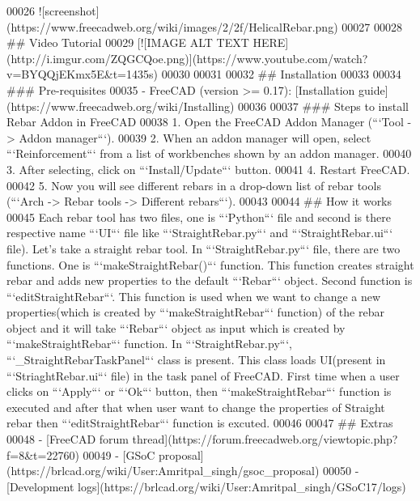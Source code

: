 \begin{DoxyCode}
00026 ![screenshot](https://www.freecadweb.org/wiki/images/2/2f/HelicalRebar.png)
00027 
00028 ## Video Tutorial
00029 [![IMAGE ALT TEXT
       HERE](http://i.imgur.com/ZQGCQoe.png)](https://www.youtube.com/watch?v=BYQQjEKmx5E&t=1435s)
00030 
00031 
00032 ## Installation
00033 
00034 ### Pre-requisites
00035 - FreeCAD (version >= 0.17): [Installation guide](https://www.freecadweb.org/wiki/Installing)
00036  
00037 ### Steps to install Rebar Addon in FreeCAD
00038 1. Open the FreeCAD Addon Manager (```Tool -> Addon manager```).
00039 2. When an addon manager will open, select ```Reinforcement``` from a list of workbenches shown by an
       addon manager.
00040 3. After selecting, click on ```Install/Update``` button.
00041 4. Restart FreeCAD.
00042 5. Now you will see different rebars in a drop-down list of rebar tools (```Arch -> Rebar tools ->
       Different rebars```).
00043 
00044 ## How it works
00045 Each rebar tool has two files, one is ```Python``` file and second is there respective name ```UI```
       file like ```StraightRebar.py``` and ```StraightRebar.ui``` file). Let's take a straight rebar tool. In
       ```StraightRebar.py``` file, there are two functions. One is ```makeStraightRebar()``` function. This function
       creates straight rebar and adds new properties to the default ```Rebar``` object. Second function is
       ```editStraightRebar```. This function is used when we want to change a new properties(which is created by
       ```makeStraightRebar``` function) of the rebar object and it will take ```Rebar``` object as input which is created by
       ```makeStraightRebar``` function. In ```StraightRebar.py```, ```\_StraightRebarTaskPanel``` class is
       present. This class loads UI(present in ```StriaghtRebar.ui``` file) in the task panel of FreeCAD. First time when
       a user clicks on ```Apply``` or ```Ok``` button, then ```makeStraightRebar``` function is executed and after
       that when user want to change the properties of Straight rebar then ```editStraightRebar``` function is
       excuted. 
00046 
00047 ## Extras
00048 - [FreeCAD forum thread](https://forum.freecadweb.org/viewtopic.php?f=8&t=22760)
00049 - [GSoC proposal](https://brlcad.org/wiki/User:Amritpal\_singh/gsoc\_proposal)
00050 - [Development logs](https://brlcad.org/wiki/User:Amritpal\_singh/GSoC17/logs)
\end{DoxyCode}
